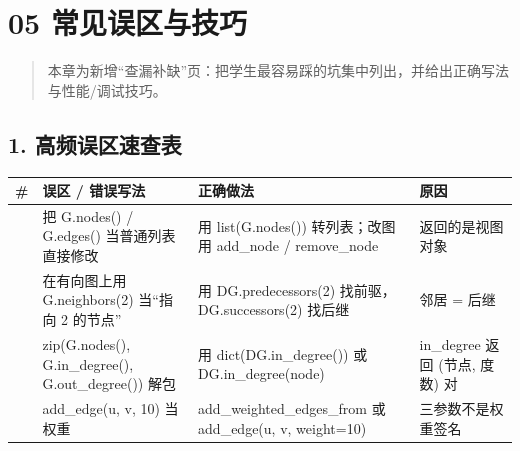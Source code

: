 \section{05
常见误区与技巧}\label{ux5e38ux89c1ux8befux533aux4e0eux6280ux5de7-5}

\begin{quote}
本章为新增``查漏补缺''页：把学生最容易踩的坑集中列出，并给出正确写法与性能/调试技巧。
\end{quote}

\subsection{1.
高频误区速查表}\label{ux9ad8ux9891ux8befux533aux901fux67e5ux8868-5}

{\def\LTcaptype{none} %
\begin{longtable}[]{@{}
  >{\raggedright\arraybackslash}p{}
  >{\raggedright\arraybackslash}p{}
  >{\raggedright\arraybackslash}p{}
  >{\raggedright\arraybackslash}p{}@{}}
\toprule\noalign{}
\begin{minipage}[b]{\linewidth}\raggedright
\#
\end{minipage} & \begin{minipage}[b]{\linewidth}\raggedright
误区 / 错误写法
\end{minipage} & \begin{minipage}[b]{\linewidth}\raggedright
正确做法
\end{minipage} & \begin{minipage}[b]{\linewidth}\raggedright
原因
\end{minipage} \\
\midrule\noalign{}
\endhead
\bottomrule\noalign{}
\endlastfoot
1 & 把 G.nodes() / G.edges() 当普通列表直接修改 & 用 list(G.nodes())
转列表；改图用 add\_node / remove\_node & 返回的是视图对象 \\
2 & 在有向图上用 G.neighbors(2) 当``指向 2 的节点'' & 用
DG.predecessors(2) 找前驱，DG.successors(2) 找后继 & 邻居 = 后继 \\
3 & zip(G.nodes(), G.in\_degree(), G.out\_degree()) 解包 & 用
dict(DG.in\_degree()) 或 DG.in\_degree(node) & in\_degree 返回 (节点,
度数) 对 \\
4 & add\_edge(u, v, 10) 当权重 & add\_weighted\_edges\_from 或
add\_edge(u, v, weight=10) & 三参数不是权重签名 \\

\end{longtable}}
